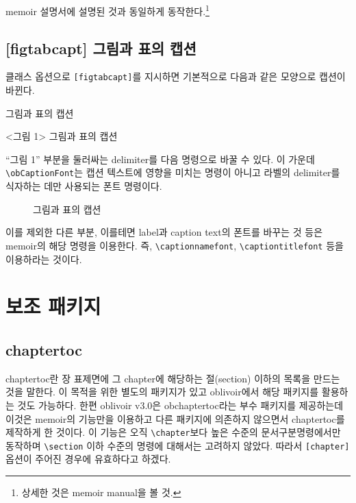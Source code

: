 \documentclass[
	12pt,
	a4paper,
	kosection,
	footnote,
	nobookmarks,
	microtype,
	figtabcapt,
]{oblivoir}
\begin{document}
\footnotesatfoot
\textsf{memoir} 설명서에 설명된 것과 동일하게 동작한다.\footnote{상세한 것은 memoir manual을 볼 것.}

\subsection{[figtabcapt] 그림과 표의 캡션}

클래스 옵션으로 \texttt{[figtabcapt]}를 지시하면 기본적으로 다음과 같은 모양으로 캡션이 바뀐다.

\begin{boxedverbatim}
\caption{그림과 표의 캡션}
\end{boxedverbatim}
\begin{minipage}{\linewidth}
\centering
<그림 1> \quad 그림과 표의 캡션
\end{minipage}

\medskip

``그림 1'' 부분을 둘러싸는 delimiter를 다음 명령으로 바꿀 수 있다. 이 가운데
\verb|\obCaptionFont|는 캡션 텍스트에 영향을 미치는 명령이 아니고 라벨의 delimiter를
식자하는 데만 사용되는 폰트 명령이다.
\begin{boxedverbatim}
\renewcommand*\obCaptionnameOpen{[}
\renewcommand*\obCaptionnameClose{]}
\obCaptionFont{\sffamily\bfseries}
\end{boxedverbatim}
\renewcommand*\obCaptionnameOpen{[}
\renewcommand*\obCaptionnameClose{]}
\obCaptionFont{\sffamily}

\begin{figure}[h]
\caption{그림과 표의 캡션}
\end{figure}

이를 제외한 다른 부분, 이를테면 label과 caption text의 폰트를 바꾸는 것 등은 memoir의
해당 명령을 이용한다. 즉, \verb|\captionnamefont|, \verb|\captiontitlefont| 등을 이용하라는 것이다.

\section{보조 패키지}

\subsection{chaptertoc}

chaptertoc란 장 표제면에 그 chapter에 해당하는 절(section) 이하의 목록을
만드는 것을 말한다. 이 목적을 위한 별도의 패키지가 있고 oblivoir에서 해당 패키지를
활용하는 것도 가능하다. 한편 oblivoir v3.0은 \textsf{obchaptertoc}라는 부수
패키지를 제공하는데 이것은 \textsf{memoir}의 기능만을 이용하고 다른 패키지에
의존하지 않으면서 chaptertoc를 제작하게 한 것이다.
이 기능은 오직 \verb|\chapter|보다 높은 수준의 문서구분명령에서만 동작하며
\verb|\section| 이하 수준의 명령에 대해서는 고려하지 않았다. 따라서 \verb|[chapter]| 옵션이
주어진 경우에 유효하다고 하겠다.
\end{document}
